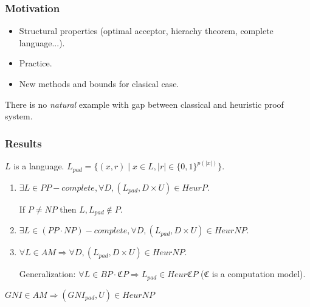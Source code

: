 \begin{frame}
    \frametitle{Motivation}

    \pause
    \begin{itemize}
	    \item Structural properties (optimal acceptor, hierachy theorem, complete
    		language...).
        \pause
    	\item Practice.
    	\pause
        \item New methods and bounds for clasical case.
    \end{itemize}

    \begin{statement}
        There is no {\it natural} example with gap between classical and heuristic proof system.
    \end{statement}
\end{frame}

\begin{frame}
    \frametitle{Results}

    $L$ is a language.
    $L_{pad} = \{(x, r) \mid x \in L, |r| \in \{0, 1 \}^{p(|x|)}\}$.
    
    \pause
    \begin{enumerate}
		\item $\exists L \in PP-complete, \forall D,
    		(L_{pad}, D \times U) \in HeurP$.

            \pause
            If $P \neq NP$ then $L, L_{pad} \notin P$.
    	\pause
    	\item $\exists L \in (PP \cdot NP)-complete, \forall D,
		    (L_{pad}, D \times U) \in HeurNP$.

    	\pause
    	\item $\forall L \in AM \Rightarrow \forall D,
    		(L_{pad}, D \times U) \in HeurNP$.

            \pause
            
            \vspace{0.5cm}
            Generalization:
		    $\forall L \in BP \cdot \mathfrak{C}P \Rightarrow L_{pad}
            \in Heur\mathfrak{C}P$ ($\mathfrak{C}$ is a computation
            model).    
    \end{enumerate}

    \pause
    \begin{example}
        $GNI \in AM \Rightarrow (GNI_{pad}, U) \in HeurNP$
    \end{example}
\end{frame}

